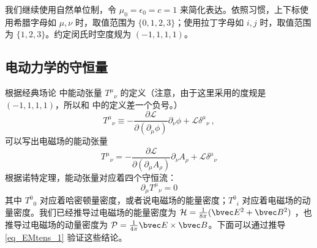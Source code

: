 

我们继续使用自然单位制，令 $\mu_0=\epsilon_0=c=1$ 来简化表达。依照习惯，上下标使用希腊字母如 $\mu, \nu$ 时，取值范围为 $\{0, 1, 2, 3\}$；使用拉丁字母如 $i, j$ 时，取值范围为 $\{1, 2, 3\}$。约定闵氏时空度规为 $(-1,1,1,1)$。

\subsection{电动力学的守恒量}
根据经典场论 中能动张量 ${T^\mu}_\nu$ 的定义（注意，由于这里采用的度规是 $(-1,1,1,1)$，所以和  中的定义差一个负号。）
\begin{equation}
T^\mu{}_\nu \equiv -\frac{\partial \mathcal L}{\partial (\partial_\mu \phi)} \partial_\nu \phi + \mathcal L \delta^\mu{}_\nu~,
\end{equation}
可以写出电磁场的能动张量
\begin{equation}\label{eq_EMtens_1}
T^\mu{}_\nu =-\frac{\partial \mathcal L}{\partial (\partial_\mu A_\rho)} \partial_\nu A_\rho + \mathcal L \delta^\mu{}_\nu
\end{equation}
根据诺特定理，能动张量对应着四个守恒流：
\begin{equation}
\partial_\mu T^\mu{}_\nu=0
\end{equation}
其中 $T^0{}_0$ 对应着哈密顿量密度，或者说电磁场的能量密度；$T^0{}_i$ 对应着电磁场的动量密度。我们已经推导过电磁场的能量密度为 $\mathcal H=\frac{1}{8\pi}(\bvec E^2+\bvec B^2)$ ，也推导过电磁场的动量密度为 $\mathcal P=\frac{1}{4\pi} \bvec E\times \bvec B$。下面可以通过推导 \autoref{eq_EMtens_1} 验证这些结论。

